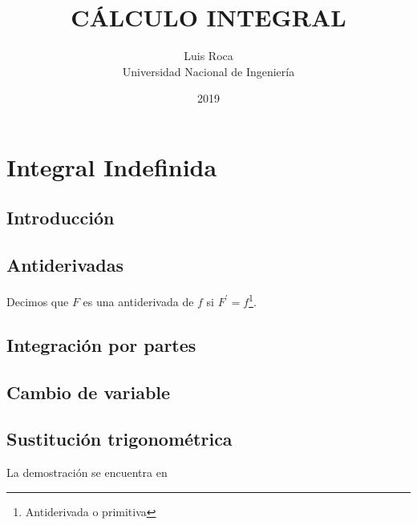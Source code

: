 \documentclass[11pt,a4paper]{book}
\title{CÁLCULO INTEGRAL}
\author{Luis Roca \\ 
Universidad Nacional de Ingeniería}
\date{2019}
\begin{document}
\frontmatter
\maketitle
\tableofcontents
\mainmatter
\chapter{Integral Indefinida}
\section*{Introducción}
\section{Antiderivadas}
Decimos que $F$ es una antiderivada de $f$ si $F^\prime=f$\footnote{Antiderivada o primitiva}.

\section{Integración por partes}
\section{Cambio de variable}
\section{Sustitución trigonométrica}
La demostración se encuentra en \cite{GANGULY1997315}
\printbibliography
\end{document}
